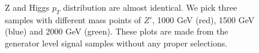\begin{figure}[hbtp]
  \centering
  \hspace{0.5cm}
  \caption{\label{fig:genZHPt}Z and Higgs $p_{T}$ distribution are almost identical. We pick three samples with different mass points of $Z'$, 1000 GeV (red), 1500 GeV (blue) and 2000 GeV (green). These plots are made from the generator level signal samples without any proper selections.}
\end{figure}

